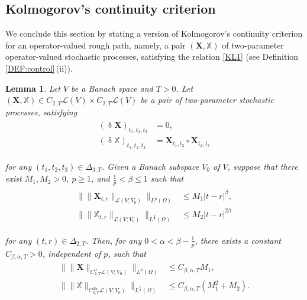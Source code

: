 \documentclass[letterpaper, 11pt,  reqno]{amsart}
\newtheorem{lemma}[theorem]{Lemma}
\newcommand{\1}{\hspace{0.5mm}\textup{I}\hspace{0.5mm}}
\newcommand{\noi}{\noindent}
\renewcommand{\L}{\mathcal{L}}
\newcommand{\al}{\alpha}
\newcommand{\be}{\beta}
\newcommand{\updl}{\updelta}
\newcommand{\Dl}{\Delta}
\newcommand{\XXb}{\mathbb{X}}
\newcommand{\Om}{\Omega}
\newcommand{\XX}{\mathbf{X}}
\numberwithin{equation}{section}
\numberwithin{theorem}{section}
\begin{document}
\subsection{Kolmogorov's continuity criterion}
\label{SUBSEC:Kol}

We conclude this section by stating a version of 
Kolmogorov's continuity criterion
for an operator-valued  rough path, 
namely, a pair $(\XX, \XXb)$ of two-parameter operator-valued stochastic processes, 
satisfying the relation  \eqref{KL1}
(see Definition \ref{DEF:control}\,(ii)).



\begin{lemma}\label{LEM:kolm}
Let $V$ be a Banach space and  $T > 0$.
Let $(\XX, \XXb)
\in  C_{2,T}\L(V)\times C_{2,T}\L(V)$ be a pair of two-parameter stochastic processes, 
satisfying
\begin{align}
\begin{split}
(\updl \XX)_{t_1,t_2,t_3}& =0, \\
(\updl \XXb)_{t_1,t_2,t_3} &  = \XX_{t_1,t_2} \circ \XX_{t_2,t_3}
\end{split}
\label{KL1}
\end{align}

\noi
 for any $(t_1,t_2,t_3)\in\Dl_{3,T}$.
Given a Banach subspace $V_0$ of $V$, 
suppose that there exist $M_1, M_2>0$, $p \ge 1$, and $\frac 1p < \be \le 1$
such that
\begin{align}
\begin{split}
\big\| \|  \XX_{t,r} \|_{\L(V; V_0)} \big\|_{L^p(\Om)} & \le M_1  |t-r|^\be,\\
\big\| \|  \XXb_{t,r} \|_{\L(V; V_0)} \big\|_{L^\frac{p}{2}(\Om)}&  \le M_2  |t-r|^{2\be}
\end{split}
\label{KL2}
\end{align}


\noi
for any $(t, r) \in \Dl_{2, T}$.
Then, for any $0<\al<\be-\frac{1}{p}$, there exists 
a constant $C_{\be,\al, T} >0$, 
independent of $p$,  such that
\begin{align}
\begin{split}
\big\| \|\XX\|_{C^\al_{2,T} \L(V; V_0)} \big\|_{L^p(\Om)} & \le C_{\be,\al, T} M_1,\\
\big\| \|\XXb\|_{C^{2\al}_{2,T} \L(V; V_0)} \big\|_{L^\frac p2(\Om)} & \le C_{\be,\al, T} 
(M_1^2 +M_2).
\end{split}
\label{KL3}
\end{align}




\end{lemma}
\end{document}
